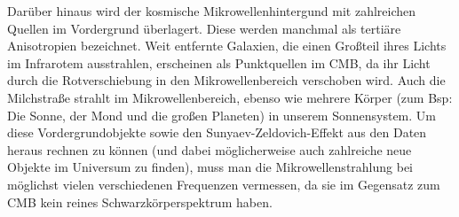 \documentclass[10pt,a4paper]{article}
\begin{document}
Darüber hinaus wird der kosmische Mikrowellenhintergund mit zahlreichen Quellen im Vordergrund überlagert. Diese werden manchmal als tertiäre Anisotropien bezeichnet.\cite{Tegmark}
Weit entfernte Galaxien, die einen Großteil ihres Lichts im Infrarotem ausstrahlen, erscheinen als Punktquellen im CMB, da ihr Licht durch die Rotverschiebung in den Mikrowellenbereich verschoben wird. Auch die Milchstraße strahlt im Mikrowellenbereich, ebenso wie mehrere Körper (zum Bsp: Die Sonne, der Mond und die großen Planeten) in unserem Sonnensystem. %
Um diese Vordergrundobjekte sowie den Sunyaev-Zeldovich-Effekt aus den Daten heraus rechnen zu können (und dabei möglicherweise auch zahlreiche neue Objekte im Universum zu finden), muss man die Mikrowellenstrahlung bei möglichst vielen verschiedenen Frequenzen vermessen, da sie im Gegensatz zum CMB kein reines Schwarzkörperspektrum haben.\cite{A+R}
\end{document}
